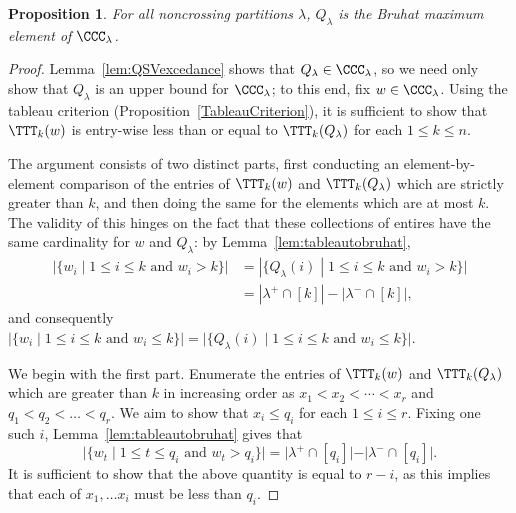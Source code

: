 \documentclass[12pt]{article}
\newtheorem{prop}[equation]{Proposition}
\theoremstyle{definition}
\theoremstyle{remark}
\numberwithin{equation}{section}
\begin{document}
\begin{prop}
\label{prop:QSVinterval}
For all noncrossing partitions $\lambda$, $Q_{\lambda}$ is the Bruhat maximum element of $\CCC_{\lambda}$.  
\end{prop}
\begin{proof}
Lemma~\ref{lem:QSVexcedance} shows that $Q_{\lambda} \in \CCC_{\lambda}$, so we need only show that $Q_{\lambda}$ is an upper bound for $\CCC_{\lambda}$; to this end, fix $w \in \CCC_{\lambda}$.  Using the tableau criterion (Proposition~\ref{TableauCriterion}), it is sufficient to show that $\TTT_{k}(w)$ is entry-wise less than or equal to $\TTT_{k}(Q_{\lambda})$ for each $1 \le k \le n$.

The argument consists of two distinct parts, first conducting an element-by-element comparison of the entries of $\TTT_{k}(w)$ and $\TTT_{k}(Q_{\lambda})$ which are strictly greater than $k$, and then doing the same for the elements which are at most $k$.  The validity of this hinges on the fact that these collections of entires have the same cardinality for $w$ and $Q_{\lambda}$: by Lemma~\ref{lem:tableautobruhat}, 
\begin{align*}
|\{ w_{i} \;|\; \text{$1 \le i \le k$ and $w_{i} > k$}\}|
&= |\{ Q_{\lambda}(i) \;|\; \text{$1 \le i \le k$ and $w_{i} > k$}\}| \\
&= |\lambda^{+} \cap [k]| - |\lambda^{-} \cap [k] |,
\end{align*}
and consequently $|\{ w_{i} \;|\; \text{$1 \le i \le k$ and $w_{i} \le k$}\}| = |\{ Q_{\lambda}(i) \;|\; \text{$1 \le i \le k$ and $w_{i} \le k$}\}|$.

We begin with the first part.  Enumerate the entries of $\TTT_{k}(w)$ and $\TTT_{k}(Q_{\lambda})$ which are greater than $k$ in increasing order as $x_{1} < x_{2} < \cdots <  x_{r}$ and $q_{1} < q_{2} < \ldots < q_{r}$.  We aim to show that $x_{i} \le q_{i}$ for each $1 \le i \le r$.  
Fixing one such $i$, Lemma~\ref{lem:tableautobruhat} gives that
\[
|\{ w_{t} \;|\; \text{$1 \le t \le q_{i}$ and $w_{t} > q_{i}$} \}| = |\lambda^{+} \cap [q_{i}]| - |\lambda^{-} \cap [q_{i}]|.
\]
It is sufficient to show that the above quantity is equal to $r - i$, as this implies that each of $x_{1}, \ldots x_{i}$ must be less than $q_{i}$.


\end{proof}
\end{document}
